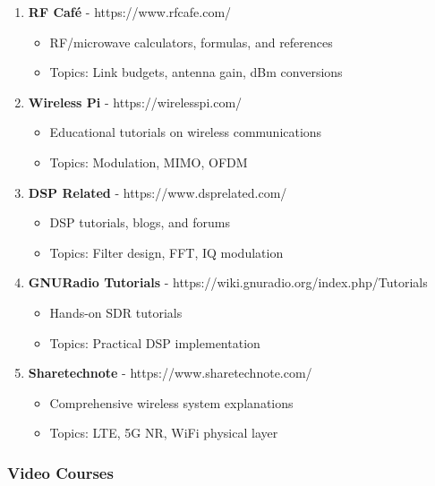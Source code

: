 \begin{enumerate}
\def\labelenumi{\arabic{enumi}.}
\setcounter{enumi}{35}
\tightlist
\item
  \textbf{RF Café} - https://www.rfcafe.com/

  \begin{itemize}
  \tightlist
  \item
    RF/microwave calculators, formulas, and references
  \item
    Topics: Link budgets, antenna gain, dBm conversions
  \end{itemize}
\item
  \textbf{Wireless Pi} - https://wirelesspi.com/

  \begin{itemize}
  \tightlist
  \item
    Educational tutorials on wireless communications
  \item
    Topics: Modulation, MIMO, OFDM
  \end{itemize}
\item
  \textbf{DSP Related} - https://www.dsprelated.com/

  \begin{itemize}
  \tightlist
  \item
    DSP tutorials, blogs, and forums
  \item
    Topics: Filter design, FFT, IQ modulation
  \end{itemize}
\item
  \textbf{GNURadio Tutorials} -
  https://wiki.gnuradio.org/index.php/Tutorials

  \begin{itemize}
  \tightlist
  \item
    Hands-on SDR tutorials
  \item
    Topics: Practical DSP implementation
  \end{itemize}
\item
  \textbf{Sharetechnote} - https://www.sharetechnote.com/

  \begin{itemize}
  \tightlist
  \item
    Comprehensive wireless system explanations
  \item
    Topics: LTE, 5G NR, WiFi physical layer
  \end{itemize}
\end{enumerate}

\subsubsection{Video Courses}\label{video-courses}

